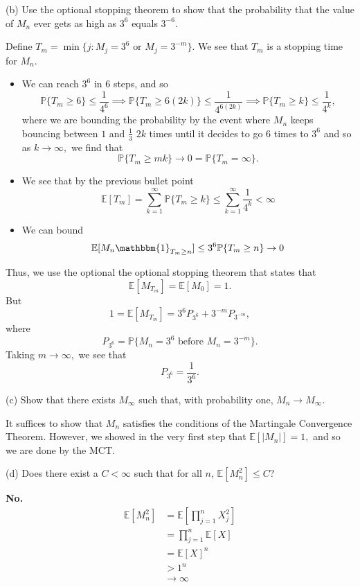\documentclass[11pt]{article}
\newcommand{\bbE}{\mathbb{E}}
\newcommand{\bbP}{\mathbb{P}}
\begin{document}
(b) Use the optional stopping theorem to show that the probability that the value of \(M_n\) ever gets as high as $3^6$ equals \(3^{-6}\).
\begin{solution}
    Define $T_m = \min\{j : M_j = 3^6 \text{ or } M_j = 3^{-m}\}.$ We see that $T_m$ is a stopping time for $M_n.$ 
    \begin{itemize}
        \item We can reach $3^6$ in $6$ steps, and so 
        \[\bbP\{T_m  \geq 6\} \leq \frac{1}{4^6}\implies \bbP\{T_m \geq 6(2k)\}\leq \frac{1}{4^{6(2k)}} \implies \bbP\{T_m \geq k\} \leq \frac{1}{4^k},\] where we are bounding the probability by the event where $M_n$ keeps bouncing  between $1$ and $\frac{1}{3}$ $2k$ times until it decides to go $6$ times to $3^6$ and so as $k\to \infty,$ we find that 
        \[\bbP\{T_m \geq mk\} \to 0 = \bbP\{T_m = \infty\}.\]
        \item We see that by the previous bullet point
        \[\bbE[T_m] =  \sum_{k=1}^\infty \bbP\{T_m \geq k\} \leq \sum_{k=1}^\infty \frac{1}{4^k} < \infty\]
        \item We can bound
        \[\bbE[M_n \mathbbm{1}_{T_m \geq n}] \leq 3^6 \bbP\{T_m \geq n\} \to 0\]
    \end{itemize}
    Thus, we use the optional the optional stopping theorem that states that 
    \[\bbE[M_{T_m}] = \bbE[M_0] = 1.\] But
    \[1 = \bbE[M_{T_m}]= 3^6 P_{3^6} + 3^{-m}P_{3^{-m}},\] where 
    \[P_{3^6} = \bbP\{M_n = 3^6 \text{ before }M_n = 3^{-m}\}.\] Taking $m\to \infty,$ we see that 
    \[P_{3^6} = \frac{1}{3^6}.\]
\end{solution}

(c) Show that there exists \(M_\infty\) such that, with probability one, \(M_n \to M_\infty\).
\begin{solution}
    It suffices to show that $M_n$ satisfies the conditions of the Martingale Convergence Theorem. However, we showed in the very first step that $\bbE[|M_n|] = 1,$ and so we are done by the MCT.
\end{solution}

(d) Does there exist a \(C < \infty\) such that for all \(n\), \(\mathbb{E}[M_n^2] \leq C\)?
\begin{solution}
    \textbf{No.}
    \begin{align*}
        \bbE[M_n^2] &= \bbE\left[\prod_{j=1}^n X_j^2\right]\\
        &= \prod_{j=1}^n\bbE[X]\\
        &= \bbE[X]^n\\
        &>1^n\\
        &\to \infty
    \end{align*}
\end{solution}
\end{document}
